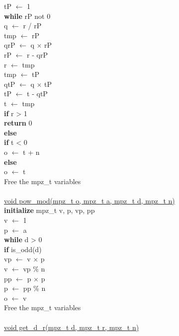 \documentclass[12pt]{article}
\begin{document}
\indent tP $\leftarrow$ 1 \\
\indent \textbf{while} rP not 0 \\
\indent \indent q $\leftarrow$ r / rP \\
\indent \indent tmp $\leftarrow$ rP \\
\indent \indent qrP $\leftarrow$ q $\times$ rP \\
\indent \indent rP $\leftarrow$ r - qrP \\
\indent \indent r $\leftarrow$ tmp \\
\indent \indent tmp $\leftarrow$ tP \\
\indent \indent qtP $\leftarrow$ q $\times$ tP \\
\indent \indent tP $\leftarrow$ t - qtP \\
\indent \indent t $\leftarrow$ tmp \\
\indent \textbf{if} r > 1 \\
\indent \indent \textbf{return} 0 \\
\indent \textbf{else} \\
\indent \indent \textbf{if} t < 0 \\
\indent \indent \indent o $\leftarrow$ t + n \\
\indent \indent \textbf{else} \\
\indent \indent \indent o $\leftarrow$ t \\
\indent Free the mpz\_t variables \\
\\
\underline{void pow\_mod(mpz\_t o, mpz\_t a, mpz\_t d, mpz\_t n)} \\
\indent \textbf{initialize} mpz\_t v, p, vp, pp \\
\indent v $\leftarrow$ 1 \\
\indent p $\leftarrow$ a \\
\indent \textbf{while} d > 0 \\
\indent \indent \textbf{if} is\_odd(d) \\
\indent \indent \indent vp $\leftarrow$ v $\times$ p \\
\indent \indent \indent v $\leftarrow$ vp \% n \\
\indent \indent pp $\leftarrow$ p $\times$ p \\
\indent \indent p $\leftarrow$ pp \% n \\
\indent o $\leftarrow$ v \\
\indent Free the mpz\_t variables \\
\\
\underline{void get\_d\_r(mpz\_t d, mpz\_t r, mpz\_t n)} \\
\end{document}
